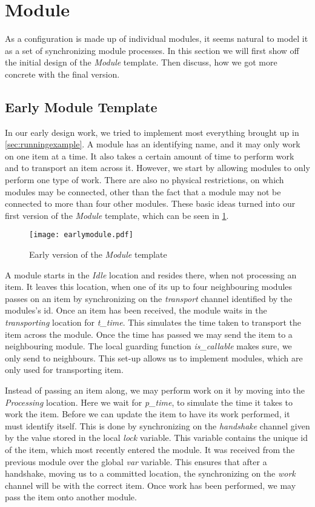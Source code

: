 \section{Module}\label{subs:module}
As a configuration is made up of individual modules, it seems natural to model it as a set of synchronizing module processes. In this section we will first show off the initial design of the \textit{Module} template. Then discuss, how we got more concrete with the final version. 

\subsection{Early Module Template}
In our early design work, we tried to implement most everything brought up in \cref{sec:runningexample}. A module has an identifying name, and it may only work on one item at a time. It also takes a certain amount of time to perform  work and to transport an item across it. However, we start by allowing modules to only perform one type of work. There are also no physical restrictions, on which modules may be connected, other than the fact that a module may not be connected to more than four other modules. These basic ideas turned into our first version of the \textit{Module} template, which can be seen in \cref{fig:earlymodule}.


\begin{figure}[h]
\centering
\texttt{[image: earlymodule.pdf]}
\caption{Early version of the \textit{Module} template}
\label{fig:earlymodule}
\end{figure}

A module starts in the \emph{Idle} location and resides there, when not processing an item. It leaves this location, when one of its up to four neighbouring modules passes on an item by synchronizing on the \emph{transport} channel identified by the modules's id. Once an item has been received, the module waits in the \emph{transporting} location for \emph{t\_time}. This simulates the time taken to transport the item across the module. Once the time has passed we may send the item to a neighbouring module. The local guarding function \emph{is\_callable} makes sure, we only send to neighbours. This set-up allows us to implement modules, which are only used for transporting item.

Instead of passing an item along, we may perform work on it by moving into the \emph{Processing} location. Here we wait for \emph{p\_time}, to simulate the time it takes to work the item. Before we can update the item to have its work performed, it must identify itself. This is done by synchronizing on the \emph{handshake} channel given by the value stored in the local \emph{lock} variable. This variable contains the unique id of the item, which most recently entered the module. It was received from the previous module over the global \emph{var} variable. This ensures that after a handshake, moving us to a committed location, the synchronizing on the \emph{work} channel will be with the correct item. Once work has been performed, we may pass the item onto another module. 

